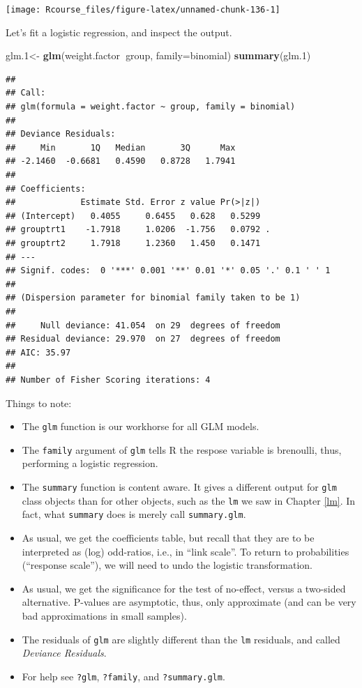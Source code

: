 \documentclass[]{book}
\newenvironment{Shaded}{\begin{snugshade}}{\end{snugshade}}
\newcommand{\KeywordTok}[1]{\textcolor[rgb]{0.13,0.29,0.53}{\textbf{#1}}}
\newcommand{\DataTypeTok}[1]{\textcolor[rgb]{0.13,0.29,0.53}{#1}}
\newcommand{\DecValTok}[1]{\textcolor[rgb]{0.00,0.00,0.81}{#1}}
\newcommand{\StringTok}[1]{\textcolor[rgb]{0.31,0.60,0.02}{#1}}
\newcommand{\OperatorTok}[1]{\textcolor[rgb]{0.81,0.36,0.00}{\textbf{#1}}}
\newcommand{\NormalTok}[1]{#1}
\providecommand{\tightlist}{%
  \setlength{\itemsep}{0pt}\setlength{\parskip}{0pt}}
\theoremstyle{definition}
\theoremstyle{definition}
\theoremstyle{definition}
\theoremstyle{remark}
\begin{document}
\texttt{[image: Rcourse\_files/figure-latex/unnamed-chunk-136-1]}

Let's fit a logistic regression, and inspect the output.

\begin{Shaded}
\begin{Highlighting}[]
\NormalTok{glm.}\DecValTok{1}\NormalTok{<-}\StringTok{ }\KeywordTok{glm}\NormalTok{(weight.factor}\OperatorTok{~}\NormalTok{group, }\DataTypeTok{family=}\NormalTok{binomial)}
\KeywordTok{summary}\NormalTok{(glm.}\DecValTok{1}\NormalTok{)}
\end{Highlighting}
\end{Shaded}

\begin{verbatim}
## 
## Call:
## glm(formula = weight.factor ~ group, family = binomial)
## 
## Deviance Residuals: 
##     Min       1Q   Median       3Q      Max  
## -2.1460  -0.6681   0.4590   0.8728   1.7941  
## 
## Coefficients:
##             Estimate Std. Error z value Pr(>|z|)  
## (Intercept)   0.4055     0.6455   0.628   0.5299  
## grouptrt1    -1.7918     1.0206  -1.756   0.0792 .
## grouptrt2     1.7918     1.2360   1.450   0.1471  
## ---
## Signif. codes:  0 '***' 0.001 '**' 0.01 '*' 0.05 '.' 0.1 ' ' 1
## 
## (Dispersion parameter for binomial family taken to be 1)
## 
##     Null deviance: 41.054  on 29  degrees of freedom
## Residual deviance: 29.970  on 27  degrees of freedom
## AIC: 35.97
## 
## Number of Fisher Scoring iterations: 4
\end{verbatim}

Things to note:

\begin{itemize}
\tightlist
\item
  The \texttt{glm} function is our workhorse for all GLM models.
\item
  The \texttt{family} argument of \texttt{glm} tells R the respose
  variable is brenoulli, thus, performing a logistic regression.
\item
  The \texttt{summary} function is content aware. It gives a different
  output for \texttt{glm} class objects than for other objects, such as
  the \texttt{lm} we saw in Chapter \ref{lm}. In fact, what
  \texttt{summary} does is merely call \texttt{summary.glm}.
\item
  As usual, we get the coefficients table, but recall that they are to
  be interpreted as (log) odd-ratios, i.e., in ``link scale''. To return
  to probabilities (``response scale''), we will need to undo the
  logistic transformation.
\item
  As usual, we get the significance for the test of no-effect, versus a
  two-sided alternative. P-values are asymptotic, thus, only approximate
  (and can be very bad approximations in small samples).
\item
  The residuals of \texttt{glm} are slightly different than the
  \texttt{lm} residuals, and called \emph{Deviance Residuals}.
\item
  For help see \texttt{?glm}, \texttt{?family}, and
  \texttt{?summary.glm}.
\end{itemize}
\end{document}
